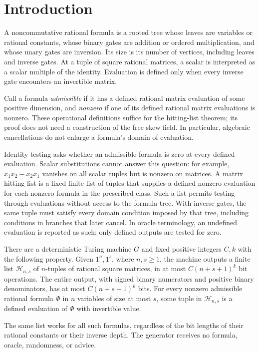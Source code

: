 \section{Introduction}
\label{sec:introduction}

A noncommutative rational formula is a rooted tree whose leaves are variables or rational constants, whose binary gates are addition or ordered multiplication, and whose unary gates are inversion. Its size is its number of vertices, including leaves and inverse gates. At a tuple of square rational matrices, a scalar is interpreted as a scalar multiple of the identity. Evaluation is defined only when every inverse gate encounters an invertible matrix.

Call a formula \emph{admissible} if it has a defined rational matrix evaluation of some positive dimension, and \emph{nonzero} if one of its defined rational matrix evaluations is nonzero. These operational definitions suffice for the hitting-list theorem; its proof does not need a construction of the free skew field. In particular, algebraic cancellations do not enlarge a formula's domain of evaluation.

Identity testing asks whether an admissible formula is zero at every
defined evaluation. Scalar substitutions cannot answer this question:
for example, $x_1x_2-x_2x_1$ vanishes on all scalar tuples but is
nonzero on matrices. A matrix hitting list is a fixed finite list of
tuples that supplies a defined nonzero evaluation for each nonzero
formula in the prescribed class. Such a list permits testing through
evaluations without access to the formula tree. With inverse gates,
the same tuple must satisfy every domain condition imposed by that
tree, including conditions in branches that later cancel.
In oracle terminology, an undefined evaluation is reported as such;
only defined outputs are tested for zero.

\begin{theorem}\label{thm:main}
There are a deterministic Turing machine $G$ and fixed positive integers $C,k$ with the following property. Given $1^n,1^s$, where $n,s\geq1$, the machine outputs a finite list $\mathcal H_{n,s}$ of $n$-tuples of rational square matrices, in at most $C(n+s+1)^k$ bit operations. The entire output, with signed binary numerators and positive binary denominators, has at most $C(n+s+1)^k$ bits. For every nonzero admissible rational formula $\Phi$ in $n$ variables of size at most $s$, some tuple in $\mathcal H_{n,s}$ is a defined evaluation of $\Phi$ with invertible value.

The same list works for all such formulas, regardless of the bit lengths of their rational constants or their inverse depth. The generator receives no formula, oracle, randomness, or advice.
\end{theorem}

